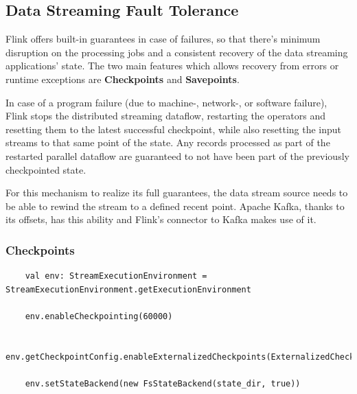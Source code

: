 \subsection{Data Streaming Fault Tolerance}

Flink offers built-in guarantees in case of failures, so that there's minimum disruption on the processing jobs and a consistent recovery of the data streaming applications' state. The two main features which allows recovery from errors or runtime exceptions are \textbf{Checkpoints} and \textbf{Savepoints}.

In case of a program failure (due to machine-, network-, or software failure), Flink stops the distributed streaming dataflow, restarting the operators and resetting them to the latest successful checkpoint, while also resetting the input streams to that same point of the state. Any records processed as part of the restarted parallel dataflow are guaranteed to not have been part of the previously checkpointed state.

For this mechanism to realize its full guarantees, the data stream source needs to be able to rewind the stream to a defined recent point. Apache Kafka, thanks to its offsets, has this ability and Flink’s connector to Kafka makes use of it.

\subsubsection{Checkpoints}

\begin{code}
    \label{code:checkpointing}
    \begin{verbatim}
    val env: StreamExecutionEnvironment = StreamExecutionEnvironment.getExecutionEnvironment
    
    env.enableCheckpointing(60000)
    
    env.getCheckpointConfig.enableExternalizedCheckpoints(ExternalizedCheckpointCleanup.RETAIN_ON_CANCELLATION)
    
    env.setStateBackend(new FsStateBackend(state_dir, true)) 
    \end{verbatim}
\end{code}~\\

